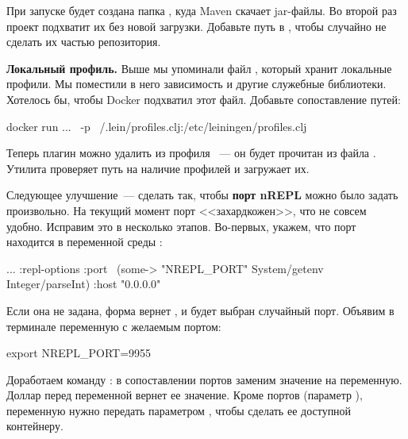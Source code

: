 При запуске  будет создана папка , куда Maven скачает jar-файлы. Во второй раз проект подхватит их без новой загрузки. Добавьте путь  в , чтобы случайно не сделать их частью репозитория.

\textbf{Локальный профиль.} Выше мы упоминали файл , который хранит локальные профили. Мы поместили в него зависимость  и другие служебные библиотеки. Хотелось бы, чтобы Docker подхватил этот файл. Добавьте сопоставление путей:

\begin{english}
  \begin{bash}
docker run ... \
  -p ~/.lein/profiles.clj:/etc/leiningen/profiles.clj
  \end{bash}
\end{english}

Теперь плагин  можно удалить из профиля ~--- он будет прочитан из файла . Утилита  проверяет путь  на наличие профилей и загружает их.

Следующее улучшение~--- сделать так, чтобы \textbf{порт nREPL} можно было задать произвольно. На текущий момент порт <<захардкожен>>, что не совсем удобно. Исправим это в несколько этапов. Во-первых, укажем, что порт находится в переменной среды :

\begin{english}
  \begin{clojure}
{...
 :repl-options
   {:port ~(some-> "NREPL_PORT"
                   System/getenv
                   Integer/parseInt)
    :host "0.0.0.0"}}
  \end{clojure}
\end{english}

Если она не задана, форма  вернет , и будет выбран случайный порт. Объявим в терминале переменную с желаемым портом:

\begin{english}
  \begin{bash}
export NREPL_PORT=9955
  \end{bash}
\end{english}

Доработаем команду : в сопоставлении портов заменим значение на переменную. Доллар перед переменной вернет ее значение. Кроме портов (параметр ), переменную нужно передать параметром , чтобы сделать ее доступной контейнеру.

